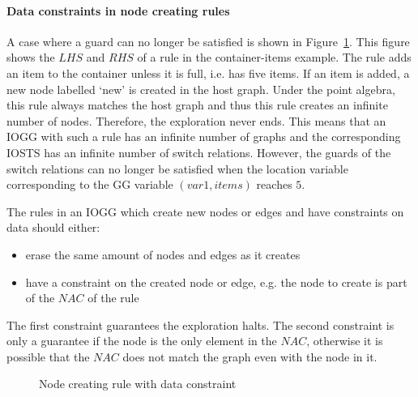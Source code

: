 \paragraph*{Data constraints in node creating rules}
A case where a guard can no longer be satisfied is shown in Figure~\ref{fig:item_example_c4}. This figure shows the $\mathit{LHS}$ and $\mathit{RHS}$ of a rule in the container-items example. The rule adds an item to the container unless it is full, i.e. has five items. If an item is added, a new node labelled `new' is created in the host graph. Under the point algebra, this rule always matches the host graph and thus this rule creates an infinite number of nodes. Therefore, the exploration never ends. This means that an IOGG with such a rule has an infinite number of graphs and the corresponding IOSTS has an infinite number of switch relations. However, the guards of the switch relations can no longer be satisfied when the location variable corresponding to the GG variable $(\mathit{var1, items})$ reaches $5$. 

The rules in an IOGG which create new nodes or edges and have constraints on data should either:
\begin{itemize}
\item erase the same amount of nodes and edges as it creates
\item have a constraint on the created node or edge, e.g. the node to create is part of the $\mathit{NAC}$ of the rule
\end{itemize}
The first constraint guarantees the exploration halts. The second constraint is only a guarantee if the node is the only element in the $\mathit{NAC}$, otherwise it is possible that the $\mathit{NAC}$ does not match the graph even with the node in it.

\begin{figure}[ht]
  \begin{center}
    \subfloat[LHS]{\label{fig:item_example_c4_lhs}\parbox[b]{6cm}{\centering}}
    \subfloat[RHS]{\label{fig:item_example_c4_rhs}\parbox[b]{6cm}{\centering}}
  \end{center}
  \caption{Node creating rule with data constraint}
  \label{fig:item_example_c4}
\end{figure}
